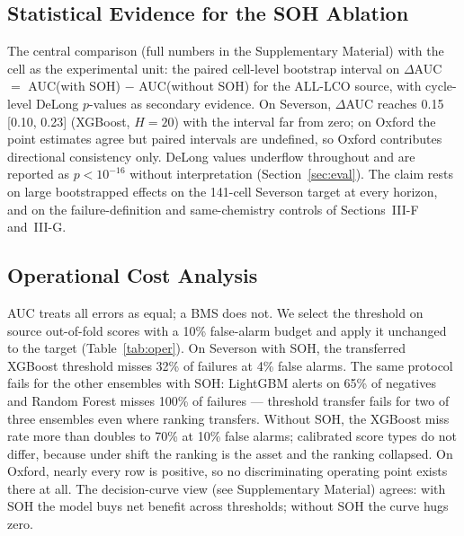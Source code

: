 \documentclass[preprint,12pt]{elsarticle}
\begin{document}
\subsection{Statistical Evidence for the SOH Ablation}
The central comparison (full numbers in the Supplementary Material) with the cell as the experimental unit: the paired cell-level bootstrap interval on $\Delta$AUC $=$ AUC(with SOH) $-$ AUC(without SOH) for the ALL-LCO source, with cycle-level DeLong $p$-values as secondary evidence. On Severson, $\Delta$AUC reaches 0.15 [0.10, 0.23] (XGBoost, $H{=}20$) with the interval far from zero; on Oxford the point estimates agree but paired intervals are undefined, so Oxford contributes directional consistency only. DeLong values underflow throughout and are reported as $p{<}10^{-16}$ without interpretation (Section~\ref{sec:eval}). The claim rests on large bootstrapped effects on the 141-cell Severson target at every horizon, and on the failure-definition and same-chemistry controls of Sections~III-F and~III-G.



\subsection{Operational Cost Analysis}
AUC treats all errors as equal; a BMS does not. We select the threshold on source out-of-fold scores with a 10\% false-alarm budget and apply it unchanged to the target (Table~\ref{tab:oper}). On Severson with SOH, the transferred XGBoost threshold misses 32\% of failures at 4\% false alarms. The same protocol fails for the other ensembles with SOH: LightGBM alerts on 65\% of negatives and Random Forest misses 100\% of failures --- threshold transfer fails for two of three ensembles even where ranking transfers. Without SOH, the XGBoost miss rate more than doubles to 70\% at 10\% false alarms; calibrated score types do not differ, because under shift the ranking is the asset and the ranking collapsed. On Oxford, nearly every row is positive, so no discriminating operating point exists there at all. The decision-curve view (see Supplementary Material) agrees: with SOH the model buys net benefit across thresholds; without SOH the curve hugs zero.
\end{document}
